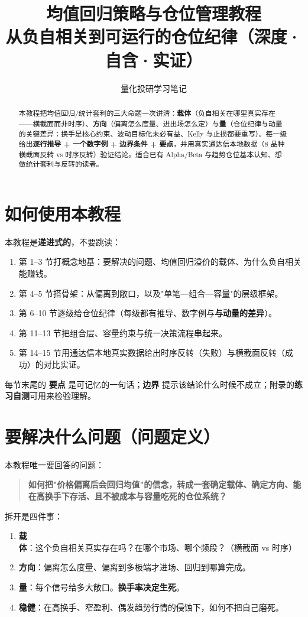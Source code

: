 \documentclass[UTF8,11pt]{ctexart}
\title{\bfseries 均值回归策略与仓位管理教程\\[3pt]\large 从负自相关到可运行的仓位纪律（深度·自含·实证）}
\author{量化投研学习笔记}
\date{}
\begin{document}
\maketitle

\begin{abstract}
本教程把均值回归/统计套利的三大命题一次讲清：\textbf{载体}（负自相关在哪里真实存在——横截面而非时序）、\textbf{方向}（偏离怎么度量、进出场怎么定）与\textbf{量}（仓位纪律与动量的关键差异：换手是核心约束、波动目标化未必有益、Kelly 与止损都要重写）。每一级给出\textbf{逐行推导 + 一个数字例 + 边界条件 + 要点}，并用真实通达信本地数据（8 品种横截面反转 vs 时序反转）验证结论。适合已有 Alpha/Beta 与趋势仓位基本认知、想做统计套利与反转的读者。
\end{abstract}

\tableofcontents
\newpage

\section*{如何使用本教程}
本教程是\textbf{递进式的}，不要跳读：
\begin{enumerate}[itemsep=2pt]
\item 第 1--3 节打概念地基：要解决的问题、均值回归溢价的载体、为什么负自相关能赚钱。
\item 第 4--5 节搭骨架：从偏离到敞口，以及"单笔—组合—容量"的层级框架。
\item 第 6--10 节逐级给仓位纪律（每级都有推导、数字例与\textbf{与动量的差异}）。
\item 第 11--13 节把组合层、容量约束与统一决策流程串起来。
\item 第 14--15 节用通达信本地真实数据给出时序反转（失败）与横截面反转（成功）的对比实证。
\end{enumerate}
每节末尾的 \textbf{要点} 是可记忆的一句话；\textbf{边界} 提示该结论什么时候不成立；附录的\textbf{练习自测}可用来检验理解。

\section{要解决什么问题（问题定义）}
本教程唯一要回答的问题：
\begin{quote}
\textbf{如何把"价格偏离后会回归均值"的信念，转成一套确定载体、确定方向、能在高换手下存活、且不被成本与容量吃死的仓位系统？}
\end{quote}
拆开是四件事：
\begin{enumerate}[itemsep=2pt]
\item \textbf{载体}：这个负自相关真实存在吗？在哪个市场、哪个频段？（横截面 vs 时序）
\item \textbf{方向}：偏离怎么度量、偏离到多极端才进场、回归到哪算完成。
\item \textbf{量}：每个信号给多大敞口。\textbf{换手率决定生死}。
\item \textbf{稳健}：在高换手、窄盈利、偶发趋势行情的侵蚀下，如何不把自己磨死。
\end{enumerate}
\end{document}
